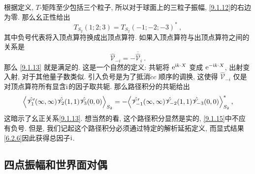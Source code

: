 根据定义, $T$-矩阵至少包括三个粒子, 所以对于球面上的三粒子振幅, \eqref{9.1.12}的右边为零. 那么幺正性给出
\begin{equation}
	T_{S_{2}}(1; 2; 3) = T_{S_{2}}(-1; -2; -3)^{*} \:, \label{9.1.13}
\end{equation}
其中负号代表将入顶点算符换成出顶点算符. 如果入顶点算符与出顶点算符之间的关系是
\begin{equation}
	\hat{\mathscr{V}}_{-i}=-\overline{\hat{\mathscr{V}}}_{i} \:. \label{9.1.14}
\end{equation}
那么 \eqref{9.1.13} 就是满足的. 这是一个自然的定义: 共轭将 $\mathrm{e}^{\mathrm{i} k \cdot X}$ 变成 $\mathrm{e}^{-\mathrm{i} k \cdot X}$, 出射变入射, 对于其他量子数类似. 
引入负号是为了抵消$\tilde{c} c$ 顺序的调换, 这使得 $\hat{\mathscr{V}}_{-i}$ 仅是对顶点算符所有显含$\mathrm{i}$的因子取共轭. 那么路径积分的共轭给出
\begin{equation}
	\Bigl\langle \hat{\mathscr{V}}_{1}^{\prime}(\infty,\infty) \hat{\mathscr{V}}_{2}(1,1) \hat{\mathscr{V}}_{3}(0,0)\Bigr\rangle_{S_{2}}=-\Bigl\langle\hat{\mathscr{V}}_{-1}^{\prime}(\infty,\infty) \hat{\mathscr{V}}_{-2}(1,1) 
	\hat{\mathscr{V}}_{-3}(0,0)\Bigr\rangle_{S_{2}}^{*} \:, \label{9.1.15}
\end{equation}
这暗示了幺正关系\eqref{9.1.13}. 想当然的看, 这个路径积分显然是实的, \eqref{9.1.15}中不应有负号. 
但是, 我们记起这个路径积分必须通过特定的解析延拓定义, 而显式结果\eqref{6.2.6}因此获得总因子$\mathrm{i}$.

\subsection*{四点振幅和世界面对偶}

